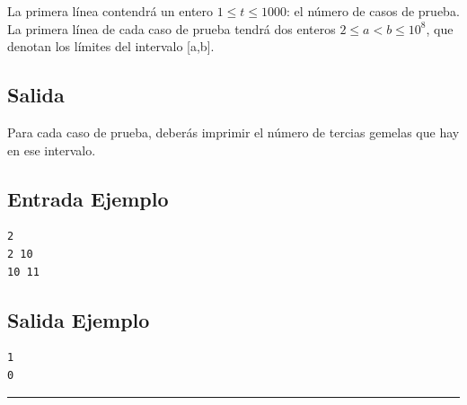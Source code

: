 La primera línea contendrá un entero $1 \leq t \leq 1000$: el número de casos de prueba. La primera línea de cada caso de prueba tendrá dos enteros $ 2 \leq a < b \leq 10^8$,  que denotan los límites del intervalo [a,b].

\subsection*{Salida}

Para cada caso de prueba, deberás imprimir el número de tercias gemelas que hay en ese intervalo.

\begin{multicols}{2}
\subsection*{Entrada Ejemplo}
\begin{verbatim}
2
2 10
10 11
\end{verbatim}


\subsection*{Salida Ejemplo}
\begin{verbatim}
1
0
\end{verbatim}
\end{multicols}


\noindent \rule[0.5ex]{1\columnwidth}{1pt}


